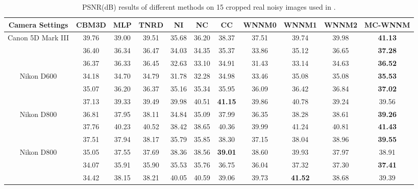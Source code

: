 \documentclass[10pt,twocolumn,letterpaper,sort&compress]{article}
\begin{document}
\begin{table}\vspace{2mm}
\caption{PSNR(dB) results of different methods on 15 cropped real noisy images used in \cite{crosschannel2016}.}
\vspace{0.5mm}
\label{tabb}
\begin{center}
\renewcommand\arraystretch{1}
\scriptsize
\begin{tabular}{|c||c|c|c|c|c|c|c|c|c|c|}
\hline
Camera Settings  
&
\textbf{CBM3D}
&
\textbf{MLP}
&
\textbf{TNRD}
&
\textbf{NI}
&
\textbf{NC}
&
\textbf{CC}
&
\textbf{WNNM0}
&
\textbf{WNNM1}
&
\textbf{WNNM2}
&
\textbf{MC-WNNM} 
\\
\hline
\multirow{3}{*}{\small{Canon 5D Mark III}}  
& 39.76 & 39.00 & 39.51 & 35.68 & 36.20 & 38.37 & 37.51 & 39.74 & 39.98 & \textbf{41.13}
\\ 
\cline{2-11} 
\multirow{3}{*}{ISO = 3200}   
& 36.40 & 36.34 & 36.47 & 34.03 & 34.35 & 35.37 & 33.86 & 35.12 & 36.65 & \textbf{37.28}
\\ 
\cline{2-11}    
& 36.37 & 36.33 & 36.45 & 32.63 & 33.10 & 34.91 & 31.43 & 33.14 & 34.63 & \textbf{36.52}  
\\
\hline
\multirow{3}{*}{Nikon D600} 
& 34.18 & 34.70 & 34.79 & 31.78 & 32.28 & 34.98 & 33.46 & 35.08 & 35.08 & \textbf{35.53}
\\ 
\cline{2-11} 
\multirow{3}{*}{ISO = 3200}   
& 35.07 & 36.20 & 36.37 & 35.16 & 35.34 & 35.95 & 36.09 & 36.42 & 36.84 & \textbf{37.02}
\\ 
\cline{2-11}    
& 37.13 & 39.33 & 39.49 & 39.98 & 40.51 & \textbf{41.15} & 39.86 & 40.78 & 39.24 & 39.56
\\
\hline
\multirow{3}{*}{Nikon D800} 
& 36.81  & 37.95 & 38.11 & 34.84 & 35.09 & 37.99 & 36.35 & 38.28 & 38.61 & \textbf{39.26}
\\ 
\cline{2-11} 
\multirow{3}{*}{ISO = 1600}   
& 37.76 & 40.23 & 40.52 & 38.42 & 38.65 & 40.36 & 39.99 & 41.24 & 40.81 & \textbf{41.43}
\\ 
\cline{2-11}    
& 37.51 & 37.94 & 38.17 & 35.79 & 35.85 & 38.30 & 37.15 & 38.04 & 38.96 & \textbf{39.55}
\\
\hline
\multirow{3}{*}{Nikon D800} 
& 35.05 & 37.55 & 37.69 & 38.36 & 38.56 & \textbf{39.01} & 38.60 & 39.93 & 37.97 & 38.91
\\ 
\cline{2-11} 
\multirow{3}{*}{ISO = 3200}   
& 34.07 & 35.91 & 35.90 & 35.53 & 35.76 & 36.75 & 36.04 & 37.32 & 37.30 & \textbf{37.41}
\\ 
\cline{2-11}    
& 34.42 & 38.15 & 38.21 & 40.05 & 40.59 & 39.06 & 39.73 & \textbf{41.52} & 38.68 & 39.39

\end{tabular}
\end{center}
\end{table}
\end{document}
